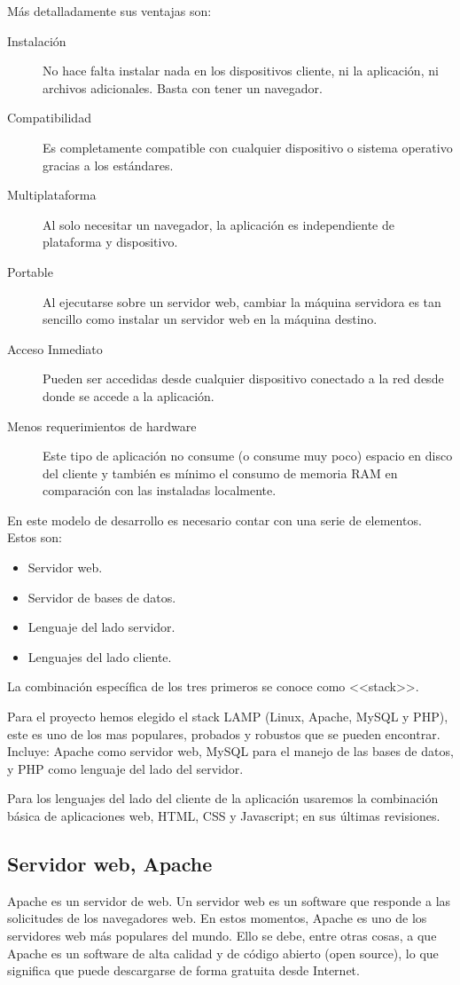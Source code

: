 Más detalladamente sus ventajas son:
\begin{description}
    \item[Instalación] No hace falta instalar nada en los dispositivos cliente, ni la aplicación, ni archivos adicionales. Basta con tener un navegador.
    \item[Compatibilidad] Es completamente compatible con cualquier dispositivo o sistema operativo gracias a los estándares.
    \item[Multiplataforma] Al solo necesitar un navegador, la aplicación es independiente de plataforma y dispositivo.
    \item[Portable] Al ejecutarse sobre un servidor web, cambiar la máquina servidora es tan sencillo como instalar un servidor web en la máquina destino.
    \item[Acceso Inmediato] Pueden ser accedidas desde cualquier dispositivo conectado a la red desde donde se accede a la aplicación. 
    \item[Menos requerimientos de hardware] Este tipo de aplicación no consume (o consume muy poco) espacio en disco del cliente y también es mínimo el consumo de memoria RAM en comparación con las instaladas localmente.
\end{description}


En este modelo de desarrollo es necesario contar con una serie de elementos. Estos son:
\begin{itemize}
    \item Servidor web.
    \item Servidor de bases de datos.
    \item Lenguaje del lado servidor.
     \item Lenguajes del lado cliente.
   \end{itemize}
La combinación específica de los tres primeros se conoce como <<stack>>. 

Para el proyecto hemos elegido el stack LAMP (Linux, Apache, MySQL y PHP), este es uno de los mas populares, probados y robustos que se pueden encontrar. Incluye: Apache como servidor web, MySQL para el manejo de las bases de datos, y PHP como lenguaje del lado del servidor.

Para los lenguajes del lado del cliente de la aplicación usaremos la combinación básica de aplicaciones web, HTML, CSS y Javascript; en sus últimas revisiones. 

\subsection{Servidor web, Apache}
Apache es un servidor de web. Un servidor web es un software que responde a las solicitudes de los navegadores web. En estos momentos, Apache es uno de los servidores web más populares del mundo. Ello se debe, entre otras cosas, a que Apache es un software de alta calidad y de código abierto (open source), lo que significa que puede descargarse de forma gratuita desde Internet.

